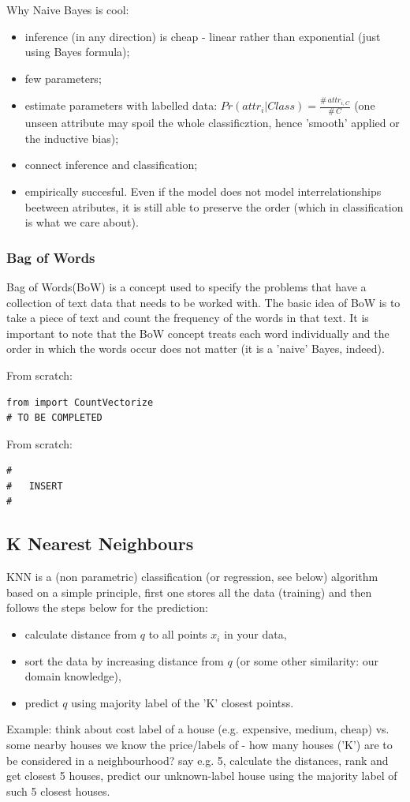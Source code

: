 \documentclass[11pt]{article}
\begin{document}
Why Naive Bayes is cool:
\begin{itemize}
	\item inference (in any direction) is cheap - linear rather than exponential (just using Bayes formula);
	\item few parameters;
	\item estimate parameters with labelled data: $Pr(attr_i | Class) = \frac{\# \, attr_{i,C}}{\# \, C}$ (one unseen attribute may spoil the whole classificztion, hence 'smooth' applied or the inductive bias);
	\item connect inference and classification;
	\item empirically succesful. Even if the model does not model interrelationships beetween atributes, it is still able to preserve the order (which in classification is what we care about).	 
\end{itemize}

\subsubsection{Bag of Words}
 Bag of Words(BoW) is a concept used to specify the problems that have a collection of text data that needs to be worked with. The basic idea of BoW is to take a piece of text and count the frequency of the words in that text. It is important to note that the BoW concept treats each word individually and the order in which the words occur does not matter (it is a 'naive' Bayes, indeed).

From scratch:
\begin{lstlisting}
from import CountVectorize
# TO BE COMPLETED
\end{lstlisting}

From scratch:
\begin{lstlisting}
#
#	INSERT 
#
\end{lstlisting}

\subsection{K Nearest Neighbours} \label{K_Nearest_Neighbours} 
KNN is a (non parametric) classification (or regression, see below) algorithm based on a simple principle, first one stores all the data (training) and then follows the steps below for the prediction:
\begin{itemize}
	\item calculate distance from $q$ to all points $x_i$ in your data,
	\item sort the data by increasing distance from $q$ (or some other similarity: our domain knowledge),
	\item predict $q$ using majority label of the 'K' closest pointss.
\end{itemize}
Example: think about cost label of a house (e.g. expensive, medium, cheap) vs. some nearby houses we know the price/labels of - how many houses ('K') are to be considered in a neighbourhood? say e.g. 5, calculate the distances, rank and get closest 5 houses, predict our unknown-label house using the majority label of such 5 closest houses.  
\end{document}
